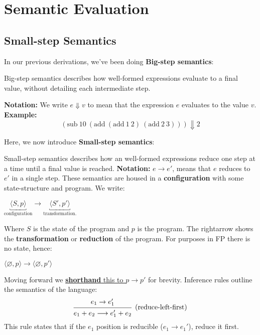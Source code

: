 \newpage
\section{Semantic Evaluation}
\subsection{Small-step Semantics}

\noindent
In our previous derivations, we've been doing \textbf{Big-step semantics}:

\begin{Def}

    Big-step semantics describes how well-formed expressions evaluate to a final value, without detailing each intermediate step.
    
    \medskip
    \noindent\textbf{Notation:} We write $e \Downarrow v$ to mean that the expression $e$ evaluates to the value $v$.\\
    \noindent\textbf{Example:}
    \[
    (\text{sub}\ 10\ (\text{add}\ (\text{add}\ 1\ 2)\ (\text{add}\ 2\ 3))) \Downarrow 2
    \]
    \end{Def}

\noindent
Here, we now introduce \textbf{Small-step semantics}:

\begin{Def}

    Small-step semantics describes how an well-formed expressions reduce one step at a time until a final value is reached.
    \noindent\textbf{Notation:} $e \rightarrow e'$, means that $e$ reduces to $e'$ in a single step. These semantics are 
    housed in a \textbf{configuration} with some state-structure and program. We write:
    
    \begin{center}
    \LARGE
    $\underbracket{\langle S,p\rangle}_{\text{configuration}} \longrightarrow \underbracket{\langle S',p'\rangle}_{\text{transformation.}}$
    \normalsize
    \end{center}
    \noindent
    Where $S$ is the state of the program and $p$ is the program. The rightarrow shows the \textbf{transformation} or \textbf{reduction} of the program.
    For purposes in FP there is no state, hence:
    \begin{center}
    \LARGE
    $\langle \varnothing, p\rangle \longrightarrow \langle \varnothing,p'\rangle$
    \normalsize
    \end{center}
    \noindent
    Moving forward we \underline{\textbf{shorthand} this to $p \rightarrow p'$} for brevity. Inference 
    rules outline the semantics of the language:
    \Large
    \[
    \begin{prooftree}
    \hypo{e_1 \rightarrow e_1'}
    \Infer1[(\text{reduce-left-first})]{e_1 + e_2 \longrightarrow e_1' + e_2}
    \end{prooftree}
    \]
    \normalsize
    \noindent
    This rule states that if the $e_1$ position is reducible ($e_1\to e_1'$), reduce it first.

\end{Def}

